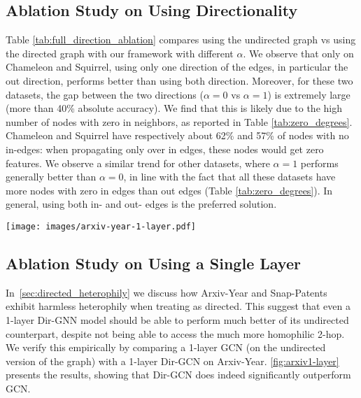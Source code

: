 \documentclass{article}
\theoremstyle{plain}
\theoremstyle{definition}
\theoremstyle{remark}
\begin{document}
\subsection{Ablation Study on Using Directionality}
Table \ref{tab:full_direction_ablation} compares using the undirected graph vs using the directed graph with our framework with different $\alpha$. We observe that only on Chameleon and Squirrel, using only one direction of the edges, in particular the out direction, performs better than using both direction. Moreover, for these two datasets, the gap between the two directions ($\alpha=0$ vs $\alpha=1$) is extremely large (more than 40\% absolute accuracy). We find that this is likely due to the high number of nodes with zero in neighbors, as reported in Table \ref{tab:zero_degrees}. Chameleon and Squirrel have respectively about 62\% and 57\% of nodes with no in-edges: when propagating only over in edges, these nodes would get zero features. 
We observe a similar trend for other datasets, where $\alpha=1$ performs generally better than $\alpha=0$, in line with the fact that all these datasets have more nodes with zero in edges than out edges (Table \ref{tab:zero_degrees}). In general, using both in- and out- edges is the preferred solution.


\begin{figure*}
    \centering
    \texttt{[image: images/arxiv-year-1-layer.pdf]}
    \caption{Performance of GCN (on the undirected version of the graph) and Dir-GCN on Arxiv-Year when using only one layer. Remarkably, directionality yields significant benefits, even in the absence of access to the homophilic directed 2-hop. This is largely attributable to the harmless heterophily exhibited by the directed graph.}
    \label{fig:arxiv1-layer}
\end{figure*}

\subsection{Ablation Study on Using a Single Layer}
In~\cref{sec:directed_heterophily} we discuss how Arxiv-Year and Snap-Patents exhibit harmless heterophily when treating as directed. This suggest that even a 1-layer Dir-GNN model should be able to perform much better of its undirected counterpart, despite not being able to access the much more homophilic 2-hop. We verify this empirically by comparing a 1-layer GCN (on the undirected version of the graph) with a 1-layer Dir-GCN on Arxiv-Year. \cref{fig:arxiv1-layer} presents the results, showing that Dir-GCN does indeed significantly outperform GCN. 
\end{document}
